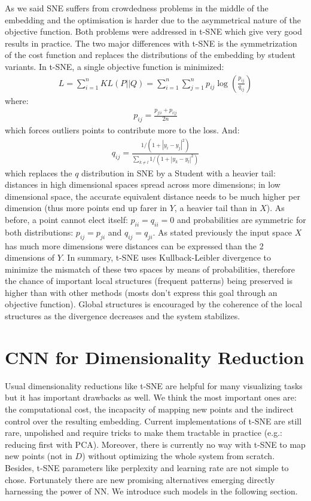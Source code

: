 \documentclass[a4paper,12pt]{report}
\newcommand{\eg}{e.g.}
\begin{document}
As we said SNE suffers from crowdedness problems in the middle of the embedding and the optimisation is harder due to the asymmetrical nature of the objective function.
Both problems were addressed in t-SNE which give very good results in practice.
The two major differences with t-SNE is the symmetrization of the cost function and replaces the distributions of the embedding by student variants.
In t-SNE, a single objective function is minimized:
\begin{eqnarray}
    L = \sum_{i=1}^n KL(P || Q) = \sum_{i=1}^n \sum_{j=1}^n p_{ij} \log\left(\frac{p_{ij}}{q_{ij}}\right)
\end{eqnarray}
where:
\begin{eqnarray}
    p_{ij} = \frac{p_{j|i} + p_{i|j}}{2 n}
\end{eqnarray}
which forces outliers points to contribute more to the loss.
And:
\begin{eqnarray}
    q_{ij} = \frac{1 / (1 + |y_i - y_j|^2)}{\sum_{k \not = l} 1/(1 + |y_k - y_l|^2)}
\end{eqnarray}
which replaces the $q$ distribution in SNE by a Student with a heavier tail: distances in high dimensional spaces spread across more dimensions; in low dimensional space, the accurate equivalent distance needs to be much higher per dimension (thus more points end up farer in $Y$, a heavier tail than in $X$).
As before, a point cannot elect itself: $p_{ii} = q_{ii} = 0$ and probabilities are symmetric for both distributions: $p_{ij} = p_{ji}$ and $q_{ij} = q_{ji}$.
As stated previously the input space $X$ has much more dimensions were distances can be expressed than the 2 dimensions of $Y$.
In summary, t-SNE uses Kullback-Leibler divergence to minimize the mismatch of these two spaces by means of probabilities, therefore the chance of important local structures (frequent patterns) being preserved is higher than with other methods (mosts don't express this goal through an objective function).
Global structures is encouraged by the coherence of the local structures as the divergence decreases and the system stabilizes.

\section{CNN for Dimensionality Reduction}
Usual dimensionality reductions like t-SNE are helpful for many visualizing tasks but it has important drawbacks as well.
We think the most important ones are: the computational cost, the incapacity of mapping new points and the indirect control over the resulting embedding.
Current implementations of t-SNE are still rare, unpolished and require tricks to make them tractable in practice (\eg: reducing first with PCA).
Moreover, there is currently no way with t-SNE to map new points (not in $D$) without optimizing the whole system from scratch.
Besides, t-SNE parameters like perplexity and learning rate are not simple to chose.
Fortunately there are new promising alternatives emerging directly harnessing the power of NN.
We introduce such models in the following section.
\end{document}
